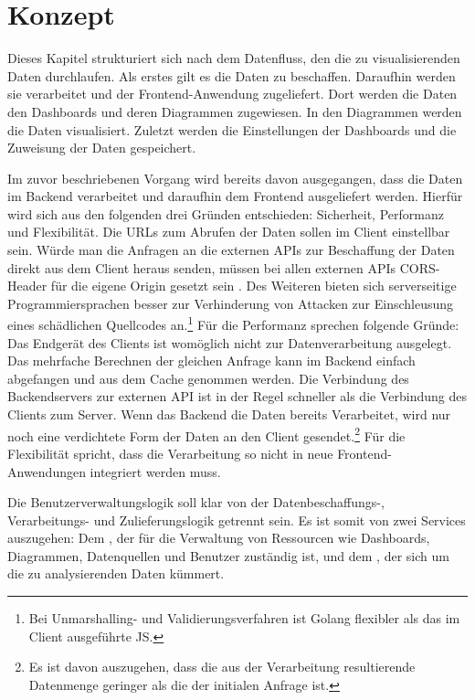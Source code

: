 \chapter{Konzept}
\label{chap:konzept}
\setcounter{footnote}{0}
Dieses Kapitel strukturiert sich nach dem Datenfluss, den die
zu visualisierenden Daten durchlaufen. Als erstes
gilt es die Daten zu beschaffen. Daraufhin werden sie verarbeitet und
der \foreignlanguage{english}{Frontend-Anwendung} zugeliefert. Dort werden die Daten den Dashboards
und deren Diagrammen zugewiesen. In den Diagrammen werden die Daten
visualisiert. Zuletzt werden die Einstellungen der Dashboards
und die Zuweisung der Daten gespeichert.

Im zuvor beschriebenen Vorgang wird bereits davon ausgegangen, dass die Daten im Backend
verarbeitet und daraufhin dem \foreignlanguage{english}{Frontend} ausgeliefert werden. Hierfür wird sich aus den
folgenden drei Gründen entschieden: Sicherheit, Performanz und Flexibilität. Die URLs
zum Abrufen der Daten sollen im Client einstellbar sein. Würde man die Anfragen an
die externen APIs zur Beschaffung der Daten direkt aus dem Client heraus senden,
müssen bei allen externen APIs CORS-Header für die eigene Origin gesetzt sein \cite{CORSW3C}.
Des Weiteren bieten sich serverseitige Programmiersprachen besser zur Verhinderung
von Attacken zur Einschleusung eines schädlichen Quellcodes an.\footnote{Bei
Unmarshalling- und Validierungsverfahren ist Golang flexibler als das im Client ausgeführte JS.}
Für die Performanz sprechen folgende Gründe: Das Endgerät des Clients ist womöglich
nicht zur Datenverarbeitung ausgelegt. Das mehrfache Berechnen der gleichen Anfrage
kann im Backend einfach abgefangen und aus dem Cache genommen werden. Die Verbindung
des \foreignlanguage{english}{Backendservers} zur externen API ist in der Regel schneller als die Verbindung
des Clients zum Server. Wenn das Backend die Daten bereits Verarbeitet, wird nur noch
eine verdichtete Form der Daten an den Client gesendet.\footnote{Es ist davon auszugehen, dass
die aus der Verarbeitung resultierende Datenmenge geringer als die der initialen Anfrage ist.}
Für die Flexibilität spricht, dass die Verarbeitung so nicht in neue Frontend-Anwendungen
integriert werden muss.

Die Benutzerverwaltungslogik soll klar von der Datenbeschaffungs-, Verarbeitungs-
und Zulieferungslogik getrennt sein. Es ist somit von zwei Services auszugehen:
Dem , der für die Verwaltung von Ressourcen wie Dashboards,
Diagrammen, Datenquellen und Benutzer zuständig ist, und dem ,
der sich um die zu analysierenden Daten kümmert.

